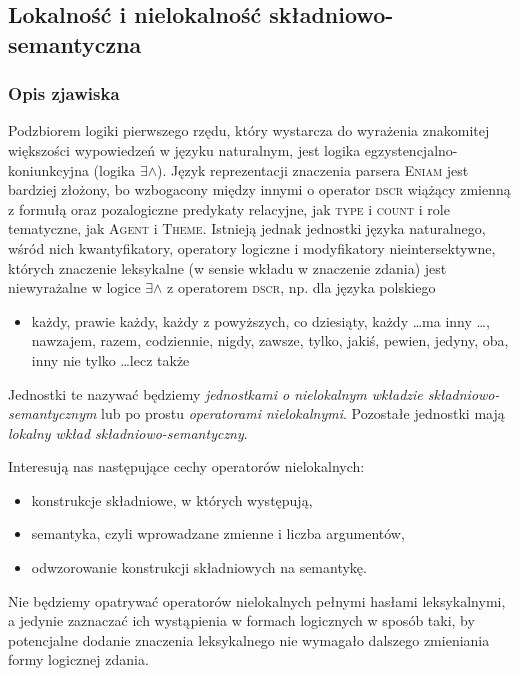 \documentclass[a4paper, 12pt]{article}
\theoremstyle{remark}
\newcommand{\eniam}{\textsc{Eniam}}
\newcommand{\agent}{\textsc{Agent}}
\newcommand{\theme}{\textsc{Theme}}
\begin{document}
{
\subsection{Lokalność i nielokalność składniowo-semantyczna}
\renewcommand\thesubsection{}
\renewcommand\thesubsubsection{}
\setcounter{subsection}{-1}
\subsubsection{Opis zjawiska} %
\label{sub:definicja_robocza1}
}

Podzbiorem logiki pierwszego rzędu, który wystarcza do wyrażenia znakomitej większości wypowiedzeń w języku naturalnym, jest logika egzystencjalno-koniunkcyjna (logika $\exists\wedge$). Język reprezentacji znaczenia parsera \eniam{} jest bardziej złożony, bo wzbogacony między innymi o operator \textsc{dscr} wiążący zmienną z formułą oraz pozalogiczne predykaty relacyjne, jak \textsc{type} i \textsc{count} i role tematyczne, jak \agent{} i \theme{}. Istnieją jednak jednostki języka naturalnego, wśród nich kwantyfikatory, operatory logiczne i modyfikatory nieintersektywne, których znaczenie leksykalne (w sensie wkładu w znaczenie zdania) jest niewyrażalne w logice $\exists\wedge$ z operatorem \textsc{dscr}, np. dla języka polskiego
\begin{itemize}
	\item każdy, prawie każdy, każdy z powyższych, co dziesiąty, 
każdy \dots ma inny \dots, nawzajem, razem,
codziennie, nigdy, zawsze, tylko, jakiś, pewien, jedyny, oba, inny
nie tylko \dots lecz także
\end{itemize}
Jednostki te nazywać będziemy \emph{jednostkami o nielokalnym wkładzie składniowo-semantycznym} lub po prostu \emph{operatorami nielokalnymi}. Pozostałe jednostki mają \emph{lokalny wkład składniowo-semantyczny}.

Interesują nas następujące cechy operatorów nielokalnych:
\begin{itemize}
\item konstrukcje składniowe, w których występują,
\item semantyka, czyli wprowadzane zmienne i liczba argumentów, 
\item odwzorowanie konstrukcji składniowych na semantykę.
\end{itemize}
Nie będziemy opatrywać operatorów nielokalnych pełnymi hasłami leksykalnymi, a jedynie zaznaczać ich wystąpienia w formach logicznych
w sposób taki, by potencjalne dodanie znaczenia leksykalnego nie wymagało dalszego zmieniania formy logicznej zdania.
\end{document}

